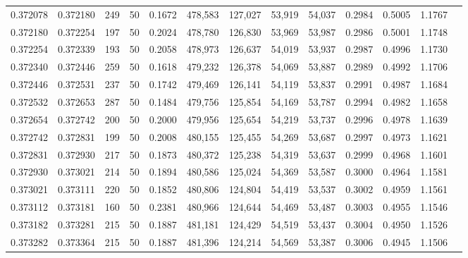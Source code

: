 \begin{tabular}{rrrrrrrrrrrrr}
0.372078 & 0.372180 &   249 &  50 &                                     0.1672 & 478,583 & 127,027 &  53,919 &  54,037 & 0.2984 & 0.5005 & 1.1767 \\
0.372180 & 0.372254 &   197 &  50 &                                     0.2024 & 478,780 & 126,830 &  53,969 &  53,987 & 0.2986 & 0.5001 & 1.1748 \\
0.372254 & 0.372339 &   193 &  50 &                                     0.2058 & 478,973 & 126,637 &  54,019 &  53,937 & 0.2987 & 0.4996 & 1.1730 \\
0.372340 & 0.372446 &   259 &  50 &                                     0.1618 & 479,232 & 126,378 &  54,069 &  53,887 & 0.2989 & 0.4992 & 1.1706 \\
0.372446 & 0.372531 &   237 &  50 &                                     0.1742 & 479,469 & 126,141 &  54,119 &  53,837 & 0.2991 & 0.4987 & 1.1684 \\
0.372532 & 0.372653 &   287 &  50 &                                     0.1484 & 479,756 & 125,854 &  54,169 &  53,787 & 0.2994 & 0.4982 & 1.1658 \\
0.372654 & 0.372742 &   200 &  50 &                                     0.2000 & 479,956 & 125,654 &  54,219 &  53,737 & 0.2996 & 0.4978 & 1.1639 \\
0.372742 & 0.372831 &   199 &  50 &                                     0.2008 & 480,155 & 125,455 &  54,269 &  53,687 & 0.2997 & 0.4973 & 1.1621 \\
0.372831 & 0.372930 &   217 &  50 &                                     0.1873 & 480,372 & 125,238 &  54,319 &  53,637 & 0.2999 & 0.4968 & 1.1601 \\
0.372930 & 0.373021 &   214 &  50 &                                     0.1894 & 480,586 & 125,024 &  54,369 &  53,587 & 0.3000 & 0.4964 & 1.1581 \\
0.373021 & 0.373111 &   220 &  50 &                                     0.1852 & 480,806 & 124,804 &  54,419 &  53,537 & 0.3002 & 0.4959 & 1.1561 \\
0.373112 & 0.373181 &   160 &  50 &                                     0.2381 & 480,966 & 124,644 &  54,469 &  53,487 & 0.3003 & 0.4955 & 1.1546 \\
0.373182 & 0.373281 &   215 &  50 &                                     0.1887 & 481,181 & 124,429 &  54,519 &  53,437 & 0.3004 & 0.4950 & 1.1526 \\
0.373282 & 0.373364 &   215 &  50 &                                     0.1887 & 481,396 & 124,214 &  54,569 &  53,387 & 0.3006 & 0.4945 & 1.1506 \\

\end{tabular}
